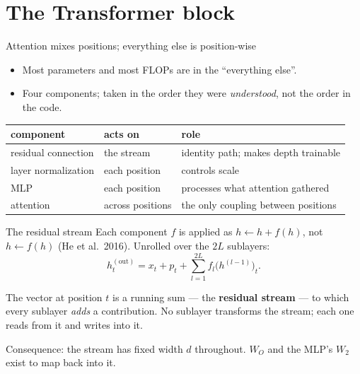 \documentclass[11pt,aspectratio=169]{beamer}
\newcommand{\dest}[1]{\textcolor{structure}{\textbf{#1}}}
\begin{document}
\section{The Transformer block}

\begin{frame}{Attention mixes positions; everything else is position-wise}
  \begin{itemize}
    \item Most parameters and most FLOPs are in the ``everything else''.
    \item Four components; taken in the order they were \emph{understood}, not the order in
          the code.
  \end{itemize}

  \vspace{1em}
  \begin{center}
  \begin{tabular}{@{}lll@{}}
    \toprule
    component & acts on & role \\
    \midrule
    residual connection & the stream & identity path; makes depth trainable \\
    layer normalization & each position & controls scale \\
    MLP & each position & processes what attention gathered \\
    attention & across positions & the only coupling between positions \\
    \bottomrule
  \end{tabular}
  \end{center}
\end{frame}

\begin{frame}{The residual stream}
  Each component $f$ is applied as $h\leftarrow h + f(h)$, not $h\leftarrow f(h)$
  (He et al.\ 2016). Unrolled over the $2L$ sublayers:
  \[
    h^{(\mathrm{out})}_t = x_t + p_t + \sum_{l=1}^{2L} f_l\big(h^{(l-1)}\big)_t .
  \]

  \vspace{0.6em}
  \begin{block}{}
    The vector at position $t$ is a running sum --- the \dest{residual stream} --- to which
    every sublayer \emph{adds} a contribution. No sublayer transforms the stream; each one
    reads from it and writes into it.
  \end{block}

  \vspace{0.6em}
  Consequence: the stream has fixed width $d$ throughout. $W_O$ and the MLP's $W_2$ exist
  to map back into it.
\end{frame}
\end{document}
